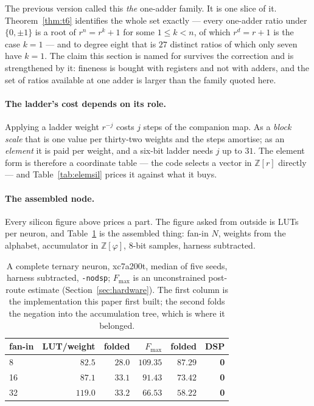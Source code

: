 \documentclass[11pt]{article}
\theoremstyle{definition}
\begin{document}
The previous version called this \emph{the} one-adder family. It is one slice of
it. Theorem~\ref{thm:t6} identifies the whole set exactly --- every one-adder
ratio under $\{0,\pm1\}$ is a root of $r^{n}=r^{k}+1$ for some $1\le k<n$, of
which $r^{d}=r+1$ is the case $k=1$ --- and to degree eight that is $27$ distinct
ratios of which only seven have $k=1$. The claim this section is named for
survives the correction and is strengthened by it: fineness is bought with
registers and not with adders, and the set of ratios available at one adder is
larger than the family quoted here.

\paragraph{The ladder's cost depends on its role.} Applying a ladder weight
$r^{-j}$ costs $j$ steps of the companion map. As a \emph{block scale} that is
one value per thirty-two weights and the steps amortise; as an \emph{element} it
is paid per weight, and a six-bit ladder needs $j$ up to $31$. The element form
is therefore a coordinate table --- the code selects a vector in
$\mathbb{Z}[r]$ directly --- and Table~\ref{tab:elemsil} prices it against what
it buys.

\paragraph{The assembled node.} Every silicon figure above prices a part. The
figure asked from outside is LUTs per neuron, and Table~\ref{tab:node} is the
assembled thing: fan-in $N$, weights from the alphabet, accumulator in
$\mathbb{Z}[\varphi]$, 8-bit samples, harness subtracted.

\begin{table}[t]\centering
\caption{A complete ternary neuron, xc7a200t, median of five seeds, harness
subtracted, \texttt{-nodsp}; $F_{\max}$ is an unconstrained post-route estimate
(Section~\ref{sec:hardware}). The first column is the implementation this paper
first built; the second folds the negation into the accumulation tree, which is
where it belonged.}
\label{tab:node}
\begin{tabular}{lrrrrr}
\toprule
fan-in & LUT/weight & folded & $F_{\max}$ & folded & DSP \\
\midrule
8  & $82.5$ & $\mathbf{28.0}$ & $109.35$ & $87.29$ & \textbf{0} \\
16 & $87.1$ & $\mathbf{33.1}$ & $91.43$ & $73.42$ & \textbf{0} \\
32 & $119.0$ & $\mathbf{33.2}$ & $66.53$ & $58.22$ & \textbf{0} \\
\bottomrule
\end{tabular}
\end{table}
\end{document}
